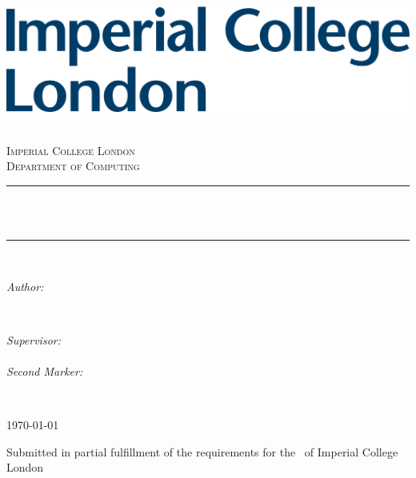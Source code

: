 \begin{titlepage}

\newcommand{\HRule}{\rule{\linewidth}{0.5mm}}
\includegraphics[width=0.4\linewidth]{figures/imperial.png}
\bigskip \bigskip
\center %

\textsc{\LARGE \reporttype}\\[1.5cm]
\textsc{\Large Imperial College London}\\[0.5cm]
\textsc{\large Department of Computing}\\[0.5cm]

\makeatletter
\HRule \\[0.4cm]
{ \huge \bfseries \@title}\\%
\HRule \\[1.5cm]

\begin{minipage}{0.4\textwidth}
\begin{flushleft} \large
\emph{Author:}\\
\@author %
\end{flushleft}
\end{minipage}
~
\begin{minipage}{0.4\textwidth}
\begin{flushright} \large
\emph{Supervisor:} \\
\supervisor \\[1.2em] %
\emph{Second Marker:} \\
\secondmarker %
\end{flushright}
\end{minipage}\\[2cm]
\makeatother

{\large \today} %


\vfill %
Submitted in partial fulfillment of the requirements for the \degreetype ~of Imperial College London
    
\end{titlepage}